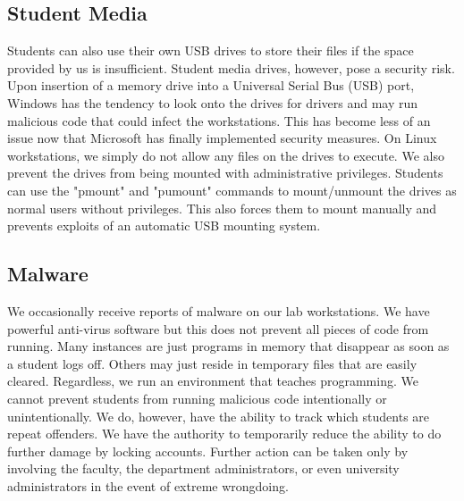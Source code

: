 \subsection{Student Media}
Students can also use their own USB drives to store their files if the space provided by us is insufficient.  Student media drives, however, pose a security risk. Upon insertion of a memory drive into a Universal Serial Bus (USB) port, Windows has the tendency to look onto the drives for drivers and may run malicious code that could infect the workstations.  This has become less of an issue now that Microsoft has finally implemented security measures.  On Linux workstations, we simply do not allow any files on the drives to execute.  We also prevent the drives from being mounted with administrative privileges.  Students can use the "pmount" and "pumount" commands to mount/unmount the drives as normal users without privileges.  This also forces them to mount manually and prevents exploits of an automatic USB mounting system.  

\subsection{Malware}
We occasionally receive reports of malware on our lab workstations.  We have powerful anti-virus software but this does not prevent all pieces of code from running.  Many instances are just programs in memory that disappear as soon as a student logs off.  Others may just reside in temporary files that are easily cleared.  Regardless, we run an environment that teaches programming.  We cannot prevent students from running malicious code intentionally or unintentionally.  We do, however, have the ability to track which students are repeat offenders.  We have the authority to temporarily reduce the ability to do further damage by locking accounts.  Further action can be taken only by involving the faculty, the department administrators, or even university administrators in the event of extreme wrongdoing. 
